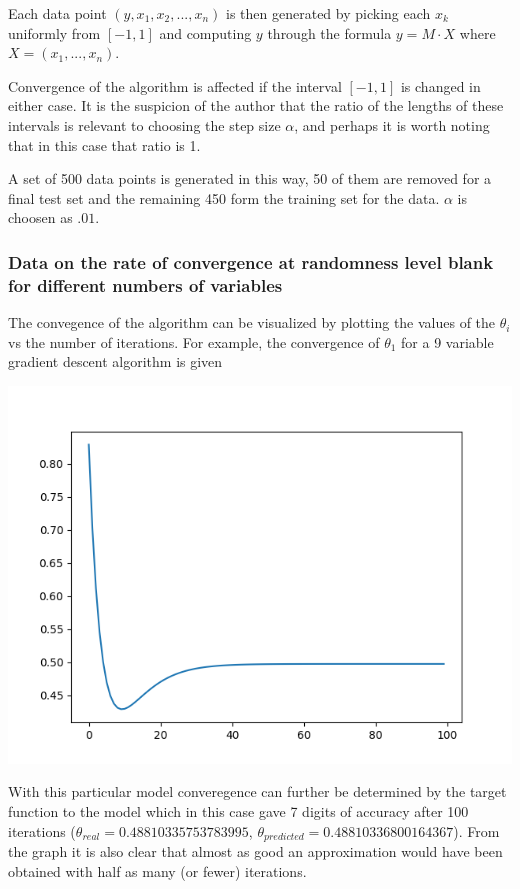 \documentclass[11pt]{article} %
\begin{document}
Each data point $(y, x_{1}, x_{2}, ... , x_{n})$ is then generated by picking each $x_{k}$ uniformly from $[-1,1]$ and computing 
$y$ through the formula $y = M \cdot X$ where $X = (x_{1}, ... , x_{n})$.  

Convergence of the algorithm is affected if the interval $[-1,1]$ is changed in either case.  It is the suspicion of the author that the ratio of the lengths of these intervals is
relevant to choosing the step size $\alpha$, and perhaps it is worth noting that in this case that ratio is 1. 

A set of 500 data points is generated in this way, 50 of them are removed for a final test set and the remaining 450 form the training set for the data. $\alpha$ is choosen as $.01$. 

\subsubsection{Data on the rate of convergence at randomness level blank for different numbers of variables} 
The convegence of the algorithm can be visualized by plotting the values of the $\theta_{i}$ vs the number of iterations. For example, the convergence of $\theta_{1}$
for a 9 variable gradient descent algorithm is given 

\begin{center}
\includegraphics{925.png}
\end{center}

 With this particular model converegence can further be determined by the target function to the model which in this case gave 7 digits of accuracy after 100 iterations 
($\theta_{real} = 0.48810335753783995$, $\theta_{ predicted} = 0.48810336800164367$).  From the graph it is also clear that almost as good an approximation would have been obtained
with half as many (or fewer) iterations. 
 
\end{document}
